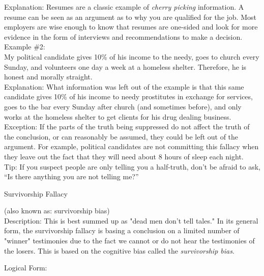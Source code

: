 \documentclass[a4paper,12pt,single,pdftex]{scrartcl}
\begin{document}
{    
      Explanation: Resumes are a classic example of {\it cherry picking}  information.  A resume can be seen as an argument as to why you are qualified for the job.  Most employers are wise enough to know that resumes are one-sided and look for more evidence in the form of interviews and recommendations to make a decision.
    \\

    
      Example \#2:
    \\

    
      My political candidate gives 10\% of his income to the needy, goes to church every Sunday, and volunteers one day a week at a homeless shelter.  Therefore, he is honest and morally straight.
    \\

    
      Explanation: What information was left out of the example is that this same candidate gives 10\% of his income to needy prostitutes in exchange for services, goes to the bar every Sunday after church (and sometimes before), and only works at the homeless shelter to get clients for his drug dealing business.
    \\

    
      Exception: If the parts of the truth being suppressed do not affect the truth of the conclusion, or can reasonably be assumed, they could be left out of the argument.  For example, political candidates are not committing this fallacy when they leave out the fact that they will need about 8 hours of sleep each night.
    \\

    
      Tip: If you suspect people are only telling you a half-truth, don’t be afraid to ask, “Is there anything you are not telling me?”
    \\

  }


Survivorship Fallacy
    
      (also known as: survivorship bias)
    \\

  
    Description: This is best summed up as "dead men don't tell tales." In its general form, the survivorship fallacy is basing a conclusion on a limited number of "winner" testimonies due to the fact we cannot or do not hear the testimonies of the losers. This is based on the cognitive bias called the {\it survivorship bias}.

    
      Logical Form:
    \\
\end{document}

